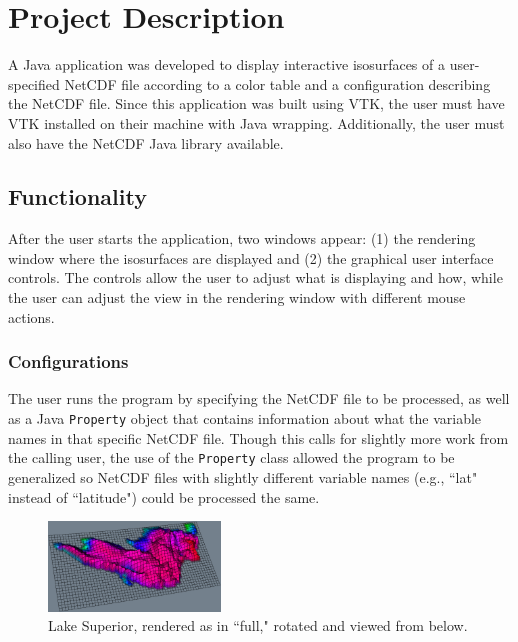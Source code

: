 \documentclass{article} %
\newcommand{\code}[1]{\texttt{#1}}
\begin{document}
\section{Project Description}

A Java application was developed to display interactive isosurfaces of a user-specified NetCDF file according to a color table and a configuration describing the NetCDF file.  Since this application was built using VTK, the user must have VTK installed on their machine with Java wrapping.  Additionally, the user must also have the NetCDF Java library available.

\subsection{Functionality}

After the user starts the application, two windows appear: (1) the rendering window where the isosurfaces are displayed and (2) the graphical user interface controls.  The controls allow the user to adjust what is displaying and how, while the user can adjust the view in the rendering window with different mouse actions.

\subsubsection{Configurations}

The user runs the program by specifying the NetCDF file to be processed, as well as a Java \code{Property} object that contains information about what the variable names in that specific NetCDF file.  Though this calls for slightly more work from the calling user, the use of the \code{Property} class allowed the program to be generalized so NetCDF files with slightly different variable names (e.g., ``lat" instead of ``latitude") could be processed the same.

\begin{figure}
   \centering
   \includegraphics[width=1.8in]{figures/lakebelow.eps}
    \caption{Lake Superior, rendered as in ``full," rotated and viewed from below.}
   \label{fig:lakebelow}
\end{figure}
\end{document}
